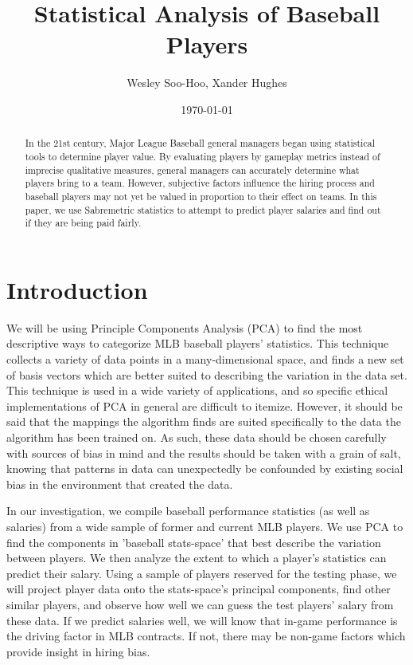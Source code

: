 \documentclass[12pt, letterpaper]{article}
\title{Statistical Analysis of Baseball Players}
\author{Wesley Soo-Hoo, Xander Hughes}
\date{\today}
\begin{document}
\maketitle

\begin{abstract}
In the 21st century, Major League Baseball general managers began using statistical tools to determine player value. By evaluating players by gameplay metrics instead of imprecise qualitative measures, general managers can accurately determine what players bring to a team. However, subjective factors influence the hiring process and baseball players may not yet be valued in proportion to their effect on teams. In this paper, we use Sabremetric statistics to attempt to predict player salaries and find out if they are being paid fairly.
\end{abstract}

\section{Introduction}
We will be using Principle Components Analysis (PCA) to find the most descriptive ways to categorize MLB baseball players' statistics. This technique collects a variety of data points in a many-dimensional space, and finds a new set of basis vectors which are better suited to describing the variation in the data set. This technique is used in a wide variety of applications, and so specific ethical implementations of PCA in general are difficult to itemize. However, it should be said that the mappings the algorithm finds are suited specifically to the data the algorithm has been trained on. As such, these data should be chosen carefully with sources of bias in mind and the results should be taken with a grain of salt, knowing that patterns in data can unexpectedly be confounded by existing social bias in the environment that created the data. 
\par In our investigation, we compile baseball performance statistics (as well as salaries) from a wide sample of former and current MLB players. We use PCA to find the components in 'baseball stats-space' that best describe the variation between players. We then analyze the extent to which a player's statistics can predict their salary. Using a sample of players reserved for the testing phase, we will project player data onto the stats-space's principal components, find other similar players, and observe how well we can guess the test players' salary from these data. If we predict salaries well, we will know that in-game performance is the driving factor in MLB contracts. If not, there may be non-game factors which provide insight in hiring bias.
\end{document}
